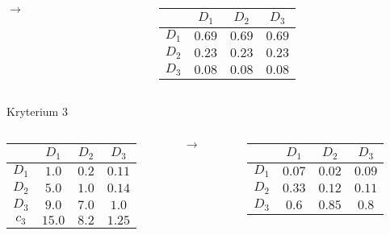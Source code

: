 \documentclass{beamer}
\begin{document}
\begin{frame}[allowframebreaks]
\begin{columns}
\begin{column}{0.1\textwidth}
			$\rightarrow$
		\end{column}
		\begin{column}{0.4\textwidth}
			\begin{table}
				\begin{tabular}{c|c|c|c}
					&	$D_1$	&	$D_2$	&	$D_3$\\ \hline
				$D_1$	&	$0.69$	&	$0.69$	&	$0.69$\\ \hline
				$D_2$	&	$0.23$	&	$0.23$	&	$0.23$\\ \hline
				$D_3$	&	$0.08$	&	$0.08$	&	$0.08$
				\end{tabular}
			\end{table}
		\end{column}
	\end{columns}
	\framebreak
	Kryterium 3
	\begin{columns}
		\begin{column}{0.4\textwidth}
			\begin{table}
				\begin{tabular}{c|c|c|c}
					&	$D_1$	&	$D_2$	&	$D_3$\\ \hline
				$D_1$	&	$1.0$	&	$0.2$	&	$0.11$\\ \hline
				$D_2$	&	$5.0$	&	$1.0$	&	$0.14$\\ \hline
				$D_3$	&	$9.0$	&	$7.0$	&	$1.0$\\ \hline\hline
				$c_3$	&	$15.0$	&	$8.2$	&	$1.25$
				\end{tabular}
			\end{table}
		\end{column}
		\begin{column}{0.1\textwidth}
			$\rightarrow$
		\end{column}
		\begin{column}{0.4\textwidth}
			\begin{table}
				\begin{tabular}{c|c|c|c}
					&	$D_1$	&	$D_2$	&	$D_3$\\ \hline
				$D_1$	&	$0.07$	&	$0.02$	&	$0.09$\\ \hline
				$D_2$	&	$0.33$	&	$0.12$	&	$0.11$\\ \hline
				$D_3$	&	$0.6$	&	$0.85$	&	$0.8$
				\end{tabular}
			\end{table}
		\end{column}
	\end{columns}
\end{frame}
\end{document}
